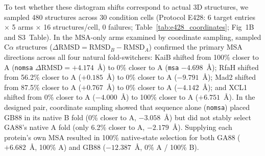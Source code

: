 \documentclass[10pt,a4paper]{article}
\begin{document}
To test whether these distogram shifts correspond to actual 3D structures, we sampled 480 structures across 30 condition cells (Protocol E428: 6 target entries $\times$ 5 arms $\times$ 16 structures/cell, 0 failures; Table~\ref{tab:e428_coordinates}; Fig~1B and S3~Table). In the MSA-only arms examined by coordinate sampling, sampled C$\alpha$ structures ($\Delta\mathrm{RMSD} = \mathrm{RMSD}_B - \mathrm{RMSD}_A$) confirmed the primary MSA directions across all four natural fold-switchers: KaiB shifted from 100\% closer to A (\texttt{nomsa} $\Delta\mathrm{RMSD} = +4.174$~\AA{}) to 0\% closer to A (\texttt{msa} $-4.698$~\AA{}); RfaH shifted from 56.2\% closer to A ($+0.185$~\AA{}) to 0\% closer to A ($-9.791$~\AA{}); Mad2 shifted from 87.5\% closer to A ($+0.767$~\AA{}) to 0\% closer to A ($-4.142$~\AA{}); and XCL1 shifted from 0\% closer to A ($-4.000$~\AA{}) to 100\% closer to A ($+6.751$~\AA{}). In the designed pair, coordinate sampling showed that sequence alone (\texttt{nomsa}) placed GB88 in its native B fold (0\% closer to A, $-3.058$~\AA{}) but did not stably select GA88's native A fold (only 6.2\% closer to A, $-2.179$~\AA{}). Supplying each protein's own MSA resulted in 100\% native-state selection for both GA88 ($+6.682$~\AA{}, 100\% A) and GB88 ($-12.387$~\AA{}, 0\% A / 100\% B).
\end{document}
